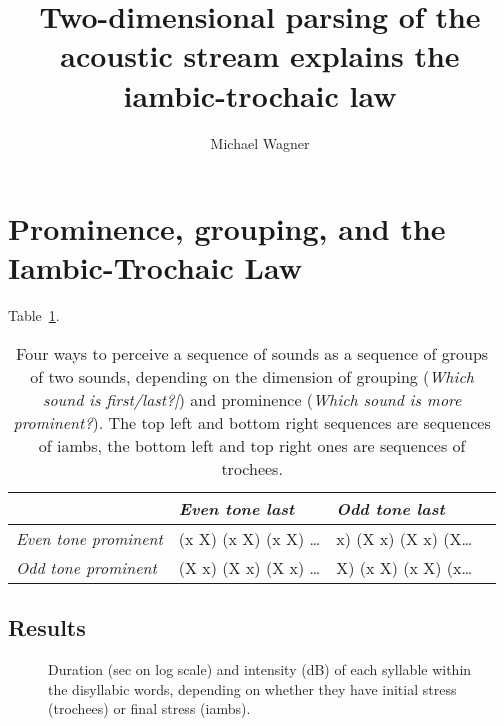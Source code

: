 \documentclass[man,natbib,floatsintext]{apa6}\usepackage[]{graphicx}\usepackage[]{color}
\title{Two-dimensional parsing of the acoustic stream explains the iambic-trochaic law}
\author{Michael Wagner}
\affiliation{McGill University}
\begin{document}






\maketitle

\section{Prominence, grouping, and the Iambic-Trochaic Law}

Table\ \ref{tableoffour}.

\begin{table}[t]
\begin{center}
\begin{tabular}{l|lll}
                     & \em Even tone last \hspace{2em}    & \em Odd  tone last\\\hline
\em Even tone prominent  & (x X) (x X) (x X) \ldots   & x) (X x) (X x) (X\ldots \\ 
\em Odd tone prominent   & (X x) (X x) (X x) \ldots   & X) (x X) (x X) (x\ldots \\
\end{tabular}
\end{center}

\caption{Four ways to perceive a sequence of sounds as a sequence of groups of two sounds, depending on the dimension of grouping (\textit{Which sound is first/last?|}) and prominence  (\textit{Which sound is more prominent?}). 
The top left and bottom right sequences are sequences of iambs, the bottom left and top right ones are sequences of trochees.}
\label{tableoffour}
\end{table}



\subsection{Results}

\begin{figure}[t!]
\centering

\caption{Duration (sec on log scale) and intensity (dB) of each syllable within the disyllabic words, depending on whether they have initial stress (trochees) or final stress (iambs).}
\label{fig:production}
\end{figure}
\end{document}
